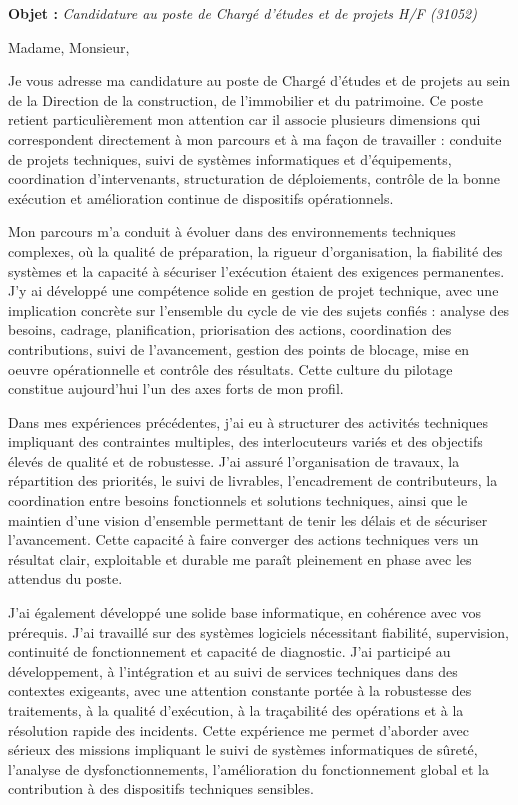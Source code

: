 \documentclass[11pt,a4paper]{altacv}
\begin{document}
\makecvheader
\vspace{-0.6cm}
\vspace{-0.4cm}

{\color{accent}\textbf{Objet :}} \textit{Candidature au poste de Chargé d'études et de projets H/F (31052)}

{\color{body}

Madame, Monsieur,

Je vous adresse ma candidature au poste de Chargé d'études et de projets au sein de la Direction de la construction, de l'immobilier et du patrimoine. Ce poste retient particulièrement mon attention car il associe plusieurs dimensions qui correspondent directement à mon parcours et à ma façon de travailler : conduite de projets techniques, suivi de systèmes informatiques et d'équipements, coordination d'intervenants, structuration de déploiements, contrôle de la bonne exécution et amélioration continue de dispositifs opérationnels.

Mon parcours m'a conduit à évoluer dans des environnements techniques complexes, où la qualité de préparation, la rigueur d'organisation, la fiabilité des systèmes et la capacité à sécuriser l'exécution étaient des exigences permanentes. J'y ai développé une compétence solide en gestion de projet technique, avec une implication concrète sur l'ensemble du cycle de vie des sujets confiés : analyse des besoins, cadrage, planification, priorisation des actions, coordination des contributions, suivi de l'avancement, gestion des points de blocage, mise en oeuvre opérationnelle et contrôle des résultats. Cette culture du pilotage constitue aujourd'hui l'un des axes forts de mon profil.

Dans mes expériences précédentes, j'ai eu à structurer des activités techniques impliquant des contraintes multiples, des interlocuteurs variés et des objectifs élevés de qualité et de robustesse. J'ai assuré l'organisation de travaux, la répartition des priorités, le suivi de livrables, l'encadrement de contributeurs, la coordination entre besoins fonctionnels et solutions techniques, ainsi que le maintien d'une vision d'ensemble permettant de tenir les délais et de sécuriser l'avancement. Cette capacité à faire converger des actions techniques vers un résultat clair, exploitable et durable me paraît pleinement en phase avec les attendus du poste.

J'ai également développé une solide base informatique, en cohérence avec vos prérequis. J'ai travaillé sur des systèmes logiciels nécessitant fiabilité, supervision, continuité de fonctionnement et capacité de diagnostic. J'ai participé au développement, à l'intégration et au suivi de services techniques dans des contextes exigeants, avec une attention constante portée à la robustesse des traitements, à la qualité d'exécution, à la traçabilité des opérations et à la résolution rapide des incidents. Cette expérience me permet d'aborder avec sérieux des missions impliquant le suivi de systèmes informatiques de sûreté, l'analyse de dysfonctionnements, l'amélioration du fonctionnement global et la contribution à des dispositifs techniques sensibles.

}
\end{document}
